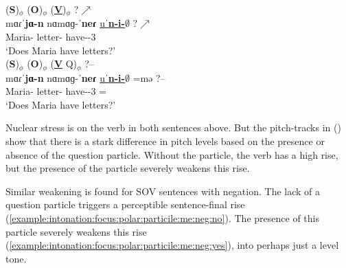 \begin{exe}
	\ex \begin{xlist}
		\ex \glll (\textbf{S})$_\phi$ (\textbf{O})$_\phi$ (\underline{\textbf{V}})$_\phi$  ?$\nearrow$ \\
		mɑɾˈ\textbf{jɑ-n} nɑmɑɡ-ˈ\textbf{neɾ} \underline{uˈ\textbf{n-i-$\emptyset$}} ?$\nearrow$ \\
		Maria-{} letter-{\pl} have-{\thgloss}-3{\sg} \\
		\trans `Does Maria have letters?'
		\label{example:intonation:focus:polar:particile:me:sov:no}
		\\ 
		\ex \glll (\textbf{S})$_\phi$ (\textbf{O})$_\phi$ (\underline{\textbf{V}} Q)$_\phi$  ?--  \\
		mɑɾˈ\textbf{jɑ-n} nɑmɑɡ-ˈ\textbf{neɾ} \underline{uˈ\textbf{n-i-$\emptyset$}} =mə  ?-- \\
		Maria-{} letter-{\pl} have-{\thgloss}-3{\sg} ={\q} \\
		\trans `Does Maria have letters?'
		\label{example:intonation:focus:polar:particile:me:sov:yes}
		\\ 
	\end{xlist}
\end{exe}

Nuclear stress is on the verb in both sentences above. But the pitch-tracks in () show that  there is a stark difference in pitch levels based on the presence or absence of the question particle. Without the particle, the verb has a high rise, but the presence of the particle severely weakens this rise. 


Similar weakening is found for SOV sentences with negation. The lack of a question particle triggers a perceptible sentence-final rise (\ref{example:intonation:focus:polar:particile:me:neg:no}). The presence of this particle severely weakens this rise (\ref{example:intonation:focus:polar:particile:me:neg:yes}), into perhaps just a level tone.  


